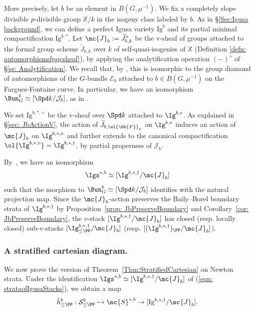\documentclass[letterpaper,11pt]{amsart}
\begin{document}
More precisely, let $b$ be an element in $B(G,\mu^{-1})$. We fix a completely slope divisible $p$-divisible group $\mathbb{X}/k$ in the isogeny class labeled by $b$. As in \S\ref{Sec:Igusa background}, we can define a perfect Igusa variety $\mathrm{Ig}^b$ and its partial minimal compactification $\mathrm{Ig}^{b,*}$. Let $\mc{J}_b := \widetilde{J}_{b,k}^{\diamond}$ be the v-sheaf of groups attached to the formal group scheme $\widetilde{J}_{b,k}$ over $k$ of self-quasi-isogenies of $\mathbb{X}$ (Definition \ref{defn: automorphismsfpqcsheaf}), by applying the analytification operation $(-)^{\diamond}$ of \S \ref{ss: Analytification}. We recall that, by \cite[Corollary~9.46]{zhang2023}, this is isomorphic to the group diamond of automorphisms of the $G$-bundle $\mathcal{E}_{b}$ attached to $b \in B(G,\mu^{-1})$ on the Fargues-Fontaine curve. In particular, we have an isomorphism $\Bun_{G}^{b} \simeq [\Spd k/\mathcal{J}_{b}]$, as in \cite[Proposition~III.5.3]{FSGeomLLC}.


We set $\mathrm{Ig}^{b,*,\diamond}$ be the v-sheaf over $\Spd k$ attached to $\Ig^{b,\ast}$. As explained in \S \ref{sec: JbActionV}, the action of $\widetilde{J}_{b,\ol{\bb{F}}_{p}}$ on $\Ig^{b,\ast}$ induces an action of $\mc{J}_b$ on $\Ig^{b,\ast,\diamond}$ and further extends to the canonical compactification $\ol{\Ig^{b,\ast, \diamond}} = \Ig^{b,\ast,\dagger}$, by partial properness of $\mathcal{J}_{b}$.

By~\cite[Proposition 9.47]{zhang2023}, we have an isomorphism
\begin{equation}{\label{eqn: strataofIgusaStacks}}
\Igs^{\ast,b} \simeq [\Ig^{b,\ast, \dagger}/\mc{J}_b] 
\end{equation}
such that the morphism to $\Bun_{G}^{b} \simeq [\Spd k/\mathcal{J}_{b}]$ identifies with the natural projection map. Since the $\mc{J}_b$-action preserves the Baily--Borel boundary strata of $\Ig^{b,\ast, \dagger}$ by Proposition~\ref{prop: JbPreserveBoundary} and Corollary~\ref{cor: JbPreserveBoundary}, the $v$-stack $[\Ig^{b,\ast,\dagger}/\mc{J}_b]$ has closed (resp. locally closed) sub-v-stacks $[\Ig_{\leq \PP}^{b,\ast,\dagger}/\mc{J}_b]$ (resp. $[(\Ig^{b,\ast,\dagger})_{\PP}/\mc{J}_b]$).

\subsubsection{A stratified cartesian diagram.}
We now prove the version of Theorem~\ref{Thm:StratifiedCartesian} on Newton strata. Under the identification $\Igs^{\ast,b}\simeq [\Ig^{b,\ast,\dagger}/\mc{J}_b]$ of (\ref{eqn: strataofIgusaStacks}), we obtain a map 
\[\tilde{h}^b_{\leq \PP}:\mathcal{S}^{b}_{\leq\PP}\hookrightarrow \mc{S}^{\ast,b}\to [\mathrm{Ig}^{b,*,\dagger}/\mc{J}_b].\] 
\end{document}
